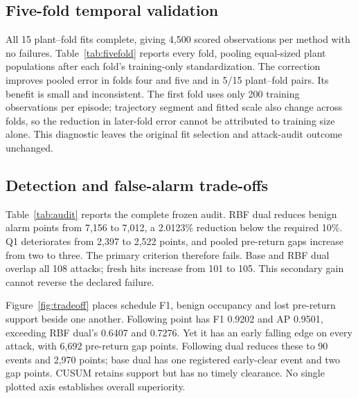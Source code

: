 \subsection{Five-fold temporal validation}
All 15 plant--fold fits complete, giving 4,500 scored observations per method with no failures. Table~\ref{tab:fivefold} reports every fold, pooling equal-sized plant populations after each fold's training-only standardization. The correction improves pooled error in folds four and five and in 5/15 plant--fold pairs. Its benefit is small and inconsistent. The first fold uses only 200 training observations per episode; trajectory segment and fitted scale also change across folds, so the reduction in later-fold error cannot be attributed to training size alone. This diagnostic leaves the original fit selection and attack-audit outcome unchanged.

\begin{table}[t]\centering
\caption{Five-fold chronological normal validation. Lower standardized RMSE is better. Every fold uses 900 targets; the folds reuse overlapping training prefixes.}\label{tab:fivefold}
\setlength{\tabcolsep}{4pt}
\end{table}

\subsection{Detection and false-alarm trade-offs}
Table~\ref{tab:audit} reports the complete frozen audit. RBF dual reduces benign alarm points from 7,156 to 7,012, a 2.0123\% reduction below the required 10\%. Q1 deteriorates from 2,397 to 2,522 points, and pooled pre-return gaps increase from two to three. The primary criterion therefore fails. Base and RBF dual overlap all 108 attacks; fresh hits increase from 101 to 105. This secondary gain cannot reverse the declared failure.

\begin{table}[t]\centering\setlength{\tabcolsep}{4pt}
\caption{All 17 registered E5 methods on 189 synthetic episodes. Benign uses 89,100 points. Hit/fresh means overlap/fresh-onset events out of 108; early is the registered continuity-based count. Clear is timely clears/detected events with return. AP evaluates continuous entry scores, not retained alarm state.}\label{tab:audit}

\end{table}

Figure~\ref{fig:tradeoff} places schedule F1, benign occupancy and lost pre-return support beside one another. Following point has F1 0.9202 and AP 0.9501, exceeding RBF dual's 0.6407 and 0.7276. Yet it has an early falling edge on every attack, with 6,692 pre-return gap points. Following dual reduces these to 90 events and 2,970 points; base dual has one registered early-clear event and two gap points. CUSUM retains support but has no timely clearance. No single plotted axis establishes overall superiority.


